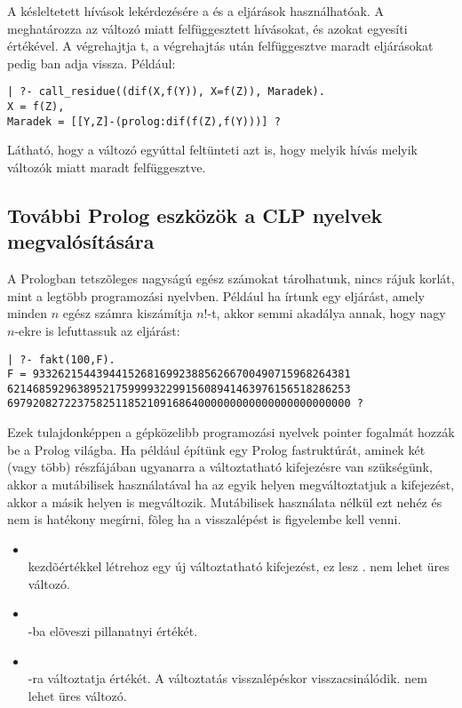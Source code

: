 A késleltetett hívások lekérdezésére a  és a 
eljárások használhatóak. A  meghatározza az 
változó miatt felfüggesztett hívásokat, és azokat egyesíti 
értékével. A  végrehajtja t, a
végrehajtás után felfüggesztve maradt eljárásokat pedig ban adja
vissza. Például:

\begin{verbatim}
| ?- call_residue((dif(X,f(Y)), X=f(Z)), Maradek).
X = f(Z),
Maradek = [[Y,Z]-(prolog:dif(f(Z),f(Y)))] ?
\end{verbatim}

Látható, hogy a  változó egyúttal feltünteti azt is, hogy melyik
hívás melyik változók miatt maradt felfüggesztve.

\subsection{További Prolog eszközök a CLP nyelvek megvalósítására}

A Prologban tetszõleges nagyságú egész számokat tárolhatunk, nincs rájuk
korlát, mint a legtöbb programozási nyelvben. Például ha írtunk egy
 eljárást, amely minden $n$ egész számra kiszámítja $n!$-t, akkor
semmi akadálya annak, hogy nagy $n$-ekre is lefuttassuk az eljárást:

\begin{verbatim}
| ?- fakt(100,F).
F = 93326215443944152681699238856266700490715968264381
621468592963895217599993229915608941463976156518286253
697920827223758251185210916864000000000000000000000000 ? 
\end{verbatim}


Ezek tulajdonképpen a gépközelibb programozási nyelvek pointer
fogalmát hozzák be a Prolog világba. Ha például építünk egy
Prolog fastruktúrát, aminek két (vagy több) részfájában
ugyanarra a változtatható kifejezésre van szükségünk, akkor a
mutábilisek használatával ha az egyik helyen megváltoztatjuk a
kifejezést, akkor a másik helyen is megváltozik. Mutábilisek
használata nélkül ezt nehéz és nem is hatékony megírni, fõleg
ha a visszalépést is figyelembe kell venni.

\begin{itemize}
\item {} \\
 kezdõértékkel létrehoz egy új változtatható kifejezést,
ez lesz .  nem lehet üres változó.

\item {} \\
-ba elõveszi  pillanatnyi értékét.

\item {} \\
-ra változtatja  értékét. A változtatás visszalépéskor
visszacsinálódik.  nem lehet üres változó.
\end{itemize}

